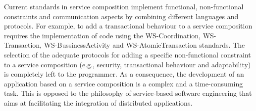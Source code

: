 








Current standards in service composition implement functional, non-functional
constraints and communication aspects by combining different languages and
protocols. For example, to add a transactional behaviour to a
service composition requires the implementation of code using the WS-Coordination,
WS-Transaction, WS-BussinessActivity and WS-AtomicTransaction standards. The
selection of the adequate protocols for adding a specific non-functional constraint to a
service composition (e.g., security, transactional behaviour and adaptability)
is completely left to the programmer. As a consequence, the development of an
application based on a service composition is a complex and a time-consuming
task. This is opposed to the philosophy of service-based software engineering
that aims at facilitating the integration of distributed applications. 

